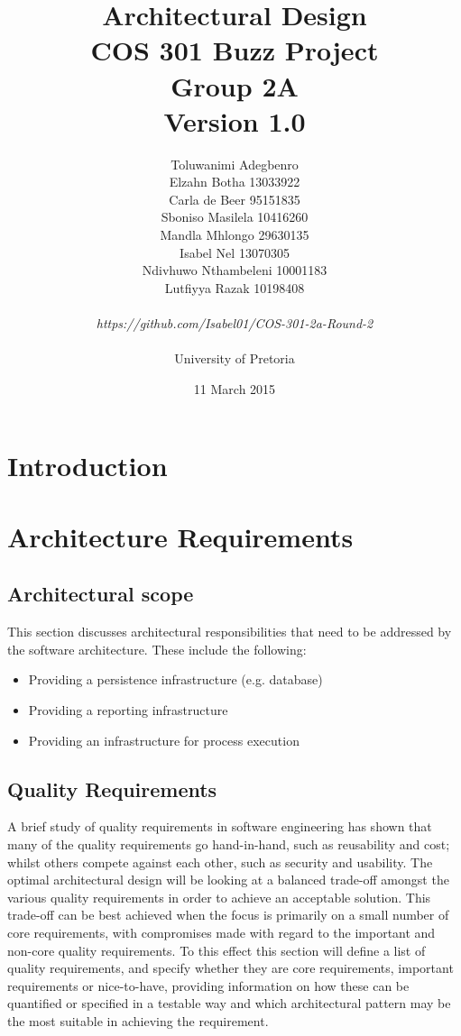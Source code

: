 \documentclass[a4paper]{article}
\title{Architectural Design
\\COS 301 Buzz Project
\\Group 2A
\\Version 1.0}
\author{Toluwanimi Adegbenro
\\Elzahn Botha 13033922
\\Carla de Beer 95151835
\\Sboniso Masilela 10416260
\\Mandla Mhlongo 29630135
\\Isabel Nel 13070305
\\Ndivhuwo Nthambeleni 10001183
\\Lutfiyya Razak 10198408
\\
\\
\textit{https://github.com/Isabel01/COS-301-2a-Round-2}
\\
\\ University of Pretoria}
\date{11 March 2015}
\begin{document}
\maketitle
\newpage


\tableofcontents
\newpage

\section{Introduction}

\section{Architecture Requirements}

\subsection{Architectural scope}
This section discusses architectural responsibilities that need to be addressed by the software
architecture. These include the following:

\begin{itemize}
\item Providing a persistence infrastructure (e.g. database)
\item Providing a reporting infrastructure
\item Providing an infrastructure for process execution
\end{itemize}

\subsection{Quality Requirements}
A brief study of quality requirements in software engineering has shown that many of the quality requirements go hand-in-hand, such as reusability and cost; whilst others compete against each other, such as security and usability. The optimal architectural design will be looking at a balanced trade-off amongst the various quality requirements in order to achieve an acceptable solution.  This trade-off can be best achieved when the focus is primarily on a small number of core requirements, with compromises made with regard to the important and non-core quality requirements. To this effect this section will define a list of quality requirements, and specify whether they are core requirements, important requirements or nice-to-have, providing information on how these can be quantified or specified in a testable way and which architectural pattern may be the most suitable in achieving the requirement.
\end{document}
